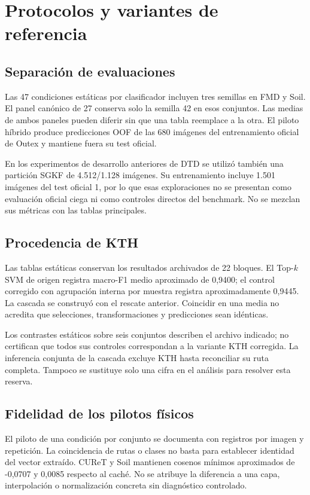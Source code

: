 \chapter{Protocolos y variantes de referencia}\label{app:procedencia}

\section{Separación de evaluaciones}
Las 47 condiciones estáticas por clasificador incluyen tres semillas en FMD y Soil. El panel canónico de 27 conserva solo la semilla 42 en esos conjuntos. Las medias de ambos paneles pueden diferir sin que una tabla reemplace a la otra. El piloto híbrido produce predicciones OOF de las 680 imágenes del entrenamiento oficial de Outex y mantiene fuera su test oficial.

En los experimentos de desarrollo anteriores de DTD se utilizó también una partición SGKF de 4.512/1.128 imágenes. Su entrenamiento incluye 1.501 imágenes del test oficial 1, por lo que esas exploraciones no se presentan como evaluación oficial ciega ni como controles directos del benchmark. No se mezclan sus métricas con las tablas principales.

\section{Procedencia de KTH}
Las tablas estáticas conservan los resultados archivados de 22 bloques. El Top-$k$ SVM de origen registra macro-F1 medio aproximado de 0,9400; el control corregido con agrupación interna por muestra registra aproximadamente 0,9445. La cascada se construyó con el rescate anterior. Coincidir en una media no acredita que selecciones, transformaciones y predicciones sean idénticas.

Los contrastes estáticos sobre seis conjuntos describen el archivo indicado; no certifican que todos sus controles correspondan a la variante KTH corregida. La inferencia conjunta de la cascada excluye KTH hasta reconciliar su ruta completa. Tampoco se sustituye solo una cifra en el análisis para resolver esta reserva.

\section{Fidelidad de los pilotos físicos}
El piloto de una condición por conjunto se documenta con registros por imagen y repetición. La coincidencia de rutas o clases no basta para establecer identidad del vector extraído. CUReT y Soil mantienen cosenos mínimos aproximados de -0,0707 y 0,0085 respecto al caché. No se atribuye la diferencia a una capa, interpolación o normalización concreta sin diagnóstico controlado.

